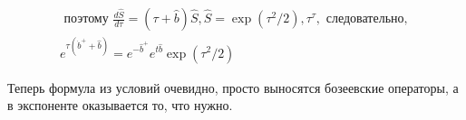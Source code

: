 \documentclass[a4paper,12pt]{article} %
\begin{document}
\begin{ttask}
\[ \begin{array}{l}
	\text { поэтому } \frac{d \hat{S}}{d \tau}=(\tau+\hat{b}) \hat{S}, \hat{S}=\exp \left(\tau^{2} / 2\right), \tau^{\tau}, \text { следовательно, } \\
	e^{\tau\left(\dot{b}^{+}+\hat{b}\right)}=e^{-\hat{b}^{+}} e^{t \hat{b}} \exp \left(\tau^{2} / 2\right)
\end{array} \]






Теперь формула из условий очевидно, просто выносятся бозеевские операторы, а в экспоненте оказывается то, что нужно.















\end{ttask}
\end{document}
